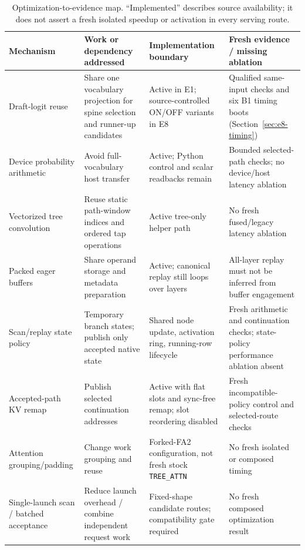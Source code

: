 \documentclass[conference]{IEEEtran}
\begin{document}
\begin{table}[t]
\caption{Optimization-to-evidence map. ``Implemented'' describes source availability; it does not assert a fresh isolated speedup or activation in every serving route.}
\label{tab:optimization-map}
\centering\footnotesize
\begin{tabularx}{\textwidth}{@{}p{}p{}YY@{}}
\toprule
Mechanism & Work or dependency addressed & Implementation boundary & Fresh evidence / missing ablation \\
\midrule
Draft-logit reuse & Share one vocabulary projection for spine selection and runner-up candidates & Active in E1; source-controlled ON/OFF variants in E8 & Qualified same-input checks and six B1 timing boots (Section~\ref{sec:e8-timing}) \\
Device probability arithmetic & Avoid full-vocabulary host transfer & Active; Python control and scalar readbacks remain & Bounded selected-path checks; no device/host latency ablation \\
Vectorized tree convolution & Reuse static path-window indices and ordered tap operations & Active tree-only helper path & No fresh fused/legacy latency ablation \\
Packed eager buffers & Share operand storage and metadata preparation & Active; canonical replay still loops over layers & All-layer replay must not be inferred from buffer engagement \\
Scan/replay state policy & Temporary branch states; publish only accepted native state & Shared node update, activation ring, running-row lifecycle & Fresh arithmetic and continuation checks; state-policy performance ablation absent \\
Accepted-path KV remap & Publish selected continuation addresses & Active with flat slots and sync-free remap; slot reordering disabled & Fresh incompatible-policy control and selected-route checks \\
Attention grouping/padding & Change work grouping and reuse & Forked-FA2 configuration, not fresh stock \texttt{TREE\_ATTN} & No fresh isolated or composed timing \\
Single-launch scan / batched acceptance & Reduce launch overhead / combine independent request work & Fixed-shape candidate routes; compatibility gate required & No fresh composed optimization result \\
\bottomrule
\end{tabularx}
\end{table}
\end{document}
